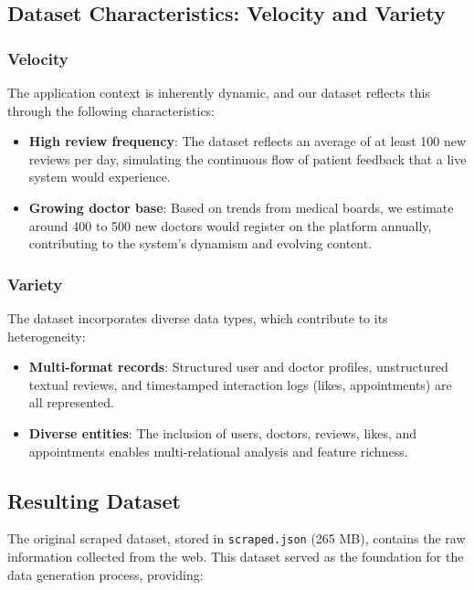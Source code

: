\subsection{Dataset Characteristics: Velocity and Variety}

\subsubsection{Velocity}

The application context is inherently dynamic, and our dataset reflects this through the following characteristics:

\begin{itemize}
    \item \textbf{High review frequency}: The dataset reflects an average of at least 100 new reviews per day, simulating the continuous flow of patient feedback that a live system would experience.
    \item \textbf{Growing doctor base}: Based on trends from medical boards, we estimate around 400 to 500 new doctors would register on the platform annually, contributing to the system’s dynamism and evolving content.
\end{itemize}

\subsubsection{Variety}

The dataset incorporates diverse data types, which contribute to its heterogeneity:

\begin{itemize}
    \item \textbf{Multi-format records}: Structured user and doctor profiles, unstructured textual reviews, and timestamped interaction logs (likes, appointments) are all represented.
    \item \textbf{Diverse entities}: The inclusion of users, doctors, reviews, likes, and appointments enables multi-relational analysis and feature richness.
\end{itemize}

\subsection{Resulting Dataset}

The original scraped dataset, stored in \texttt{scraped.json} (265 MB), contains the raw information collected from the web. This dataset served as the foundation for the data generation process, providing:

